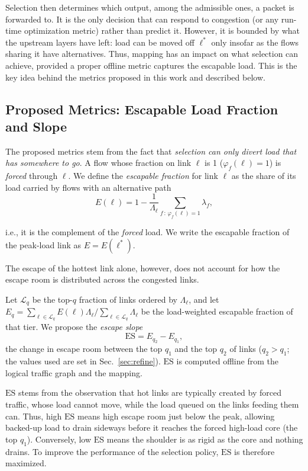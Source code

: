 Selection then determines which output, among the admissible ones, a packet is forwarded to. It is the only decision 
that can respond to congestion (or any run-time optimization metric) rather than predict it. However, it is bounded by what the upstream layers have left: load can be moved off $\ell^{*}$ only insofar as the flows sharing it have alternatives. Thus, mapping has an impact on what selection can achieve, provided a proper offline metric captures the escapable load. This is the key idea behind the metrics proposed in this work and described below. 


\subsection{Proposed Metrics: Escapable Load Fraction and Slope}
\label{sec:metrics}
The proposed metrics stem from the fact that \emph{selection can only divert load that has somewhere to go}. A flow whose fraction on link $\ell$ is 1 ($\varphi_f(\ell)=1$) is \emph{forced} through $\ell$. We define the \emph{escapable fraction} for link $\ell$ as the share of its load carried by flows with an alternative path
\begin{equation}
E(\ell) = 1 - \frac{1}{\Lambda_\ell}
\sum_{f\,:\,\varphi_f(\ell)=1} \lambda_f ,
\label{eq:e}
\end{equation}

i.e., it is the complement of the \emph{forced} load. We write the escapable fraction of the peak-load link as $E = E(\ell^{*})$.

The escape of the hottest link alone, however, does not account for how the escape room is distributed across the congested links. 

Let $\mathcal{L}_q$ be the
top-$q$ fraction of links ordered by $\Lambda_\ell$, and let
$E_q = \sum_{\ell\in\mathcal{L}_q} E(\ell)\Lambda_\ell \big/
       \sum_{\ell\in\mathcal{L}_q}\Lambda_\ell$
be the load-weighted escapable fraction of that tier. We propose the \emph{escape slope}
\begin{equation}
  \mathrm{ES} = E_{q_2} - E_{q_1},
  \label{eq:es}
\end{equation}
the change in escape room between the top $q_1$ and the top $q_2$ of links ($q_2 > q_1$; the values used are set in Sec.~\ref{sec:refine}).
$\mathrm{ES}$ is computed offline from the logical traffic graph and the mapping. 

$\mathrm{ES}$ stems from the observation that hot links are typically created by forced traffic, whose load cannot move, while the load queued on the links feeding them can. Thus, high $\mathrm{ES}$ means high escape room just below the peak, allowing backed-up load to drain sideways before it reaches the forced high-load core (the top $q_1$). Conversely, low $\mathrm{ES}$ means the shoulder is as rigid as the core and nothing drains. To improve the performance of the selection policy, $\mathrm{ES}$ is therefore maximized.
